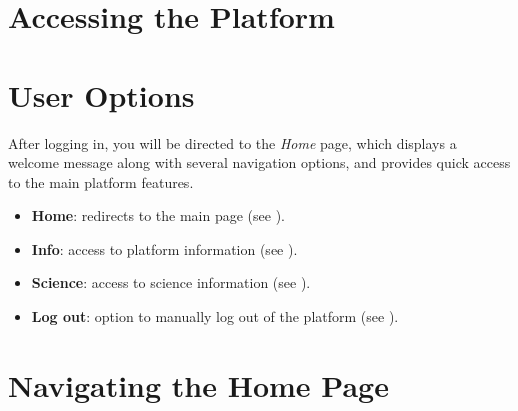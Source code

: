 


\chapter{Accessing the Platform} \label{chap:user-access}



\chapter{User Options} \label{chap:user-options}

After logging in, you will be directed to the \textsl{Home} page, which displays a welcome message along with several navigation options, and provides quick access to the main platform features.

\vspace{0.5cm}


\begin{itemize}
	\item \textbf{Home}: redirects to the main page (see ).
	\item \textbf{Info}: access to platform information (see ).
	\item \textbf{Science}: access to science information (see ).
	\item \textbf{Log out}: option to manually log out of the platform (see ).
\end{itemize}


\chapter{Navigating the Home Page} \label{chap:user-homepage}



